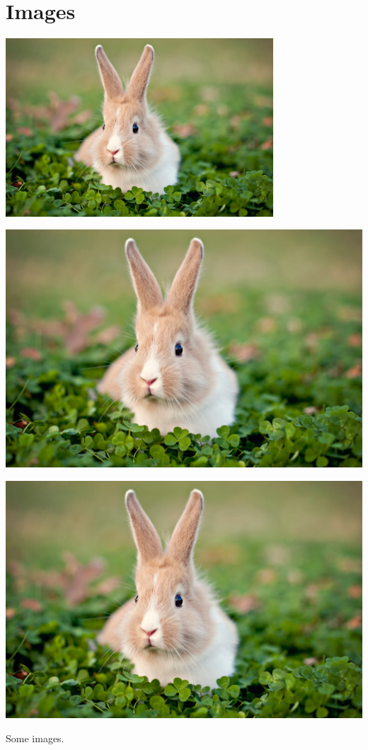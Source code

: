 \documentclass{article}
\begin{document}
\section*{Images}

\bigskip

\begin{center}
    \includegraphics[width = 10cm]{./example_images/example.jpg}

    \includegraphics[width = \textwidth]{./example_images/example.jpg}

    \includegraphics[width = 0.25 \textwidth]{./example_images/example.jpg}
\end{center}

\bigskip\noindent Some images.
\end{document}

